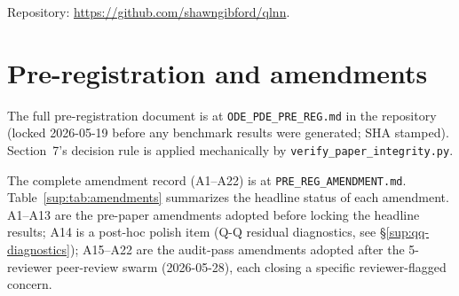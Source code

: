 \documentclass[%
  prx,
  amsmath,
  amssymb,
  aps,
  reprint,
  superscriptaddress,
  floatfix,
]{revtex4-2}
\begin{document}
Repository: \url{https://github.com/shawngibford/qlnn}.

\section{Pre-registration and amendments}
\label{sup:prereg}

The full pre-registration document is at
\texttt{ODE\_PDE\_PRE\_REG.md} in the repository (locked
2026-05-19 before any benchmark results were generated;
SHA stamped). Section~7's decision rule is applied mechanically by
\texttt{verify\_paper\_integrity.py}.

The complete amendment record (A1--A22) is at
\texttt{PRE\_REG\_AMENDMENT.md}. Table~\ref{sup:tab:amendments}
summarizes the headline status of each amendment. A1--A13 are
the pre-paper amendments adopted before locking the headline
results; A14 is a post-hoc polish item (Q-Q residual
diagnostics, see \S\ref{sup:qq-diagnostics}); A15--A22 are the
audit-pass amendments adopted after the 5-reviewer peer-review
swarm (2026-05-28), each closing a specific reviewer-flagged
concern.
\end{document}
